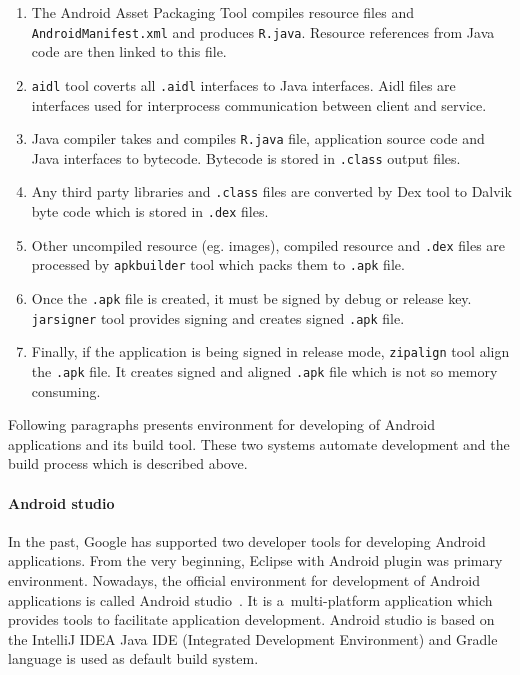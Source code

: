 \begin{enumerate}
    \item The Android Asset Packaging Tool compiles resource files and \texttt{AndroidManifest.xml} and produces
    \texttt{R.java}. Resource references from Java code are then linked to this file.
    \item \texttt{aidl} tool coverts all \texttt{.aidl} interfaces to Java interfaces. Aidl files are interfaces used
    for interprocess communication between client and service.
    \item Java compiler takes and compiles \texttt{R.java} file, application source code and Java interfaces to
    bytecode. Bytecode is stored in \texttt{.class} output files.
    \item Any third party libraries and \texttt{.class} files are converted by Dex tool to Dalvik byte code which is
    stored in \texttt{.dex} files.
    \item Other uncompiled resource (eg. images), compiled resource and \texttt{.dex} files are processed by
    \texttt{apkbuilder} tool which packs them to \texttt{.apk} file.
    \item Once the \texttt{.apk} file is created, it must be signed by debug or release key. \texttt{jarsigner} tool
    provides signing and creates signed \texttt{.apk} file.
    \item Finally, if the application is being signed in release mode, \texttt{zipalign} tool align the \texttt{.apk}
    file. It creates signed and aligned \texttt{.apk} file which is not so memory consuming.
\end{enumerate}

Following paragraphs presents environment for developing of Android applications and its build tool. These two systems
automate development and the build process which is described above.

\paragraph{Android studio}
In the past, Google has supported two developer tools for developing Android applications. From the very beginning,
Eclipse with Android plugin was primary environment. Nowadays, the official environment for development of Android
applications is called Android studio~\cite{AndroidDev}. It is a~multi-platform application which provides tools to
facilitate application development. Android studio is based on the IntelliJ IDEA Java IDE (Integrated Development
Environment) and Gradle language is used as default build system.

